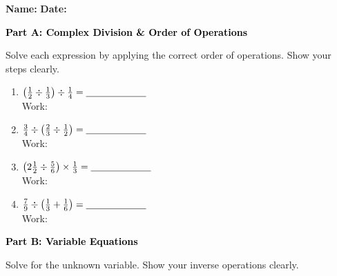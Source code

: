 \documentclass[12pt, letterpaper, fleqn]{article}
\newcommand{\blank}{\underline{\hspace{2.2cm}}}
\newcommand{\blanklong}{\underline{\hspace{6.5cm}}}
\begin{document}
\textbf{Name:} \underline{\hspace{5cm}}
\hfill
\textbf{Date:} \underline{\hspace{3cm}}\\

\begin{tcolorbox}[colback=black!10]
    \large\textcolor{black}{\textbf{Part A: Complex Division \& Order of Operations}}
\end{tcolorbox}

\vspace{3mm}
\noindent
Solve each expression by applying the correct order of operations. Show your steps clearly.

\vspace{5mm}
\begin{enumerate}[itemsep=2.0cm, leftmargin=0.6cm]
\item $\left(\frac{1}{2} \div \frac{1}{3}\right) \div \frac{1}{4} = \blank$ \\
Work: \blanklong

\item $\frac{3}{4} \div \left(\frac{2}{3} \div \frac{1}{2}\right) = \blank$ \\
Work: \blanklong

\item $\left(2\frac{1}{2} \div \frac{5}{6}\right) \times \frac{1}{3} = \blank$ \\
Work: \blanklong

\item $\frac{7}{9} \div \left(\frac{1}{3} + \frac{1}{6}\right) = \blank$ \\
Work: \blanklong
\end{enumerate}
\newpage

\begin{tcolorbox}[colback=black!10]
    \large\textcolor{black}{\textbf{Part B: Variable Equations}}
\end{tcolorbox}

\vspace{3mm}
\noindent
Solve for the unknown variable. Show your inverse operations clearly.
\end{document}
